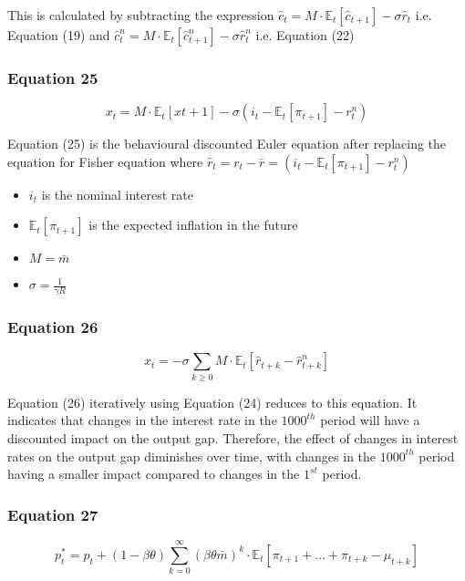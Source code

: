\documentclass{article}
\begin{document}
This is calculated by subtracting the expression $\hat{c}_{t}=M\cdot\mathbb{E}_{t}\left[\hat{c}_{t+1}\right]-\sigma\hat{r}_{t}$ i.e. Equation (19) and $\hat{c}^{n}_{t} = M\cdot\mathbb{E}_{t}\left[\hat{c}^{n}_{t+1}\right]-\sigma\hat{r}^{n}_{t}$ i.e. Equation (22)

\subsubsection*{Equation 25}
\begin{equation}\tag{25}
    x_{t}=M\cdot\mathbb{E}_{t}\left[x{t+1}\right]-\sigma(i_{t}-\mathbb{E}_{t}\left[\pi_{t+1}\right]-r^{n}_{t})
\end{equation}

Equation (25) is the behavioural discounted Euler equation after replacing the equation for Fisher equation  where $\hat r_{t}= r_{t}- \bar r = (i_{t}-\mathbb{E}_{t}\left[\pi_{t+1}\right]-r^{n}_{t})$
\begin{itemize}
    \item $i_{t}$ is the nominal interest rate
    \item $\mathbb{E}_{t}\left[\pi_{t+1}\right]$ is the expected inflation in the future
    \item $M=\bar{m}$
    \item $\sigma=\frac{1}{\gamma R}$
\end{itemize}

\subsubsection*{Equation 26}
\begin{equation}\tag{26}
    x_{t}=-\sigma\sum_{k\geq 0}{M\cdot \mathbb{E}_{t}\left[\hat{r}_{t+k}-\hat{r}_{t+k}^{n}\right]}
\end{equation}

Equation (26) iteratively using Equation (24) reduces to this equation. It indicates that changes in the interest rate in the $1000^{th}$ period will have a discounted impact on the output gap. Therefore, the effect of changes in interest rates on the output gap diminishes over time, with changes in the $1000^{th}$ period having a smaller impact compared to changes in the $1^{st}$ period.


\subsubsection*{Equation 27}
\begin{equation}\tag{27}
    p^{*}_{t}=p_{t}+(1-\beta\theta)\sum_{k=0}^{\infty}\left(\beta\theta\bar{m}\right)^{k}\cdot\mathbb{E}_{t}\left[\pi_{t+1}+...+\pi_{t+k}-\mu_{t+k}\right]
\end{equation}
\end{document}
